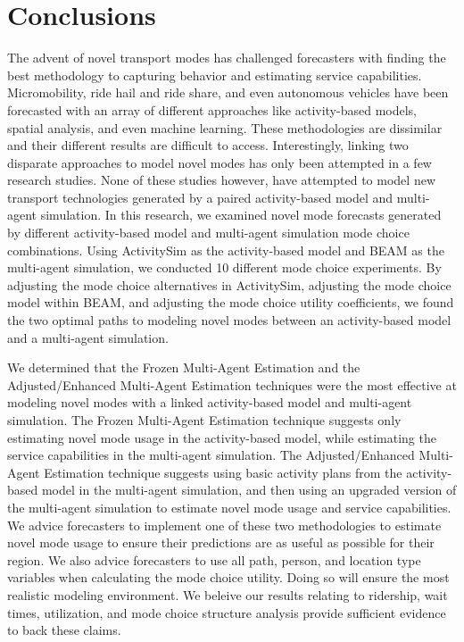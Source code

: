 \documentclass[fancy, masters]{byuthesis}
\begin{document}
\hypertarget{conclusions}{%
\chapter{Conclusions}\label{conclusions}}

The advent of novel transport modes has challenged forecasters with finding the best methodology to capturing behavior and estimating service capabilities. Micromobility, ride hail and ride share, and even autonomous vehicles have been forecasted with an array of different approaches like activity-based models, spatial analysis, and even machine learning. These methodologies are dissimilar and their different results are difficult to access. Interestingly, linking two disparate approaches to model novel modes has only been attempted in a few research studies. None of these studies however, have attempted to model new transport technologies generated by a paired activity-based model and multi-agent simulation. In this research, we examined novel mode forecasts generated by different activity-based model and multi-agent simulation mode choice combinations. Using ActivitySim as the activity-based model and BEAM as the multi-agent simulation, we conducted 10 different mode choice experiments. By adjusting the mode choice alternatives in ActivitySim, adjusting the mode choice model within BEAM, and adjusting the mode choice utility coefficients, we found the two optimal paths to modeling novel modes between an activity-based model and a multi-agent simulation.

We determined that the Frozen Multi-Agent Estimation and the Adjusted/Enhanced Multi-Agent Estimation techniques were the most effective at modeling novel modes with a linked activity-based model and multi-agent simulation. The Frozen Multi-Agent Estimation technique suggests only estimating novel mode usage in the activity-based model, while estimating the service capabilities in the multi-agent simulation. The Adjusted/Enhanced Multi-Agent Estimation technique suggests using basic activity plans from the activity-based model in the multi-agent simulation, and then using an upgraded version of the multi-agent simulation to estimate novel mode usage and service capabilities. We advice forecasters to implement one of these two methodologies to estimate novel mode usage to ensure their predictions are as useful as possible for their region. We also advice forecasters to use all path, person, and location type variables when calculating the mode choice utility. Doing so will ensure the most realistic modeling environment. We beleive our results relating to ridership, wait times, utilization, and mode choice structure analysis provide sufficient evidence to back these claims.
\end{document}
